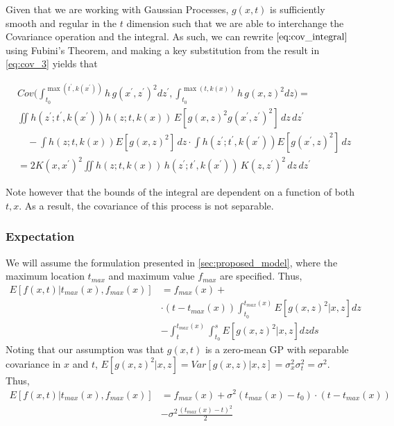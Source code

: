 Given that we are working with Gaussian Processes, $g(x,t)$ is sufficiently smooth and regular in the $t$ dimension such that we are able to interchange the Covariance operation and the integral. As such, we can rewrite $\eqref{eq:cov_integral}$ using Fubini's Theorem, and making a key substitution from the result in \eqref{eq:cov_3} yields that 

{\small
\begin{align}
\label{eq:cov_integral_interchange}
&Cov \bigg(\int_{t_0}^{\max(t^{'},k(x^{'}))} h\, g(x^{'},z^{'})^2 dz^{'}, \int_{t_0}^{\max(t,k(x))} h\, g(x,z)^2 dz \bigg) = \nonumber \\
&\iint h(z^{'}; t^{'}, k(x^{'})) h(z; t, k(x))\, E[g(x,z)^2 g(x^{'},z^{'})^2] \, dz \, dz^{'} \nonumber \\
&\quad - \int h(z; t, k(x)) E[g(x,z)^2]\,dz
    \cdot \int h(z^{'}; t^{'}, k(x^{'})) E[g(x^{'},z)^2]\,dz \nonumber \\
&= 2K(x,x^{'})^2 \iint h(z; t, k(x))\, h(z^{'}; t^{'}, k(x^{'}))\, K(z,z^{'})^2 \, dz \, dz^{'} \nonumber
\end{align}
}

Note however that the bounds of the integral are dependent on a function of both $t, x$. As a result, the covariance of this process is not separable.


\subsubsection{Expectation}
We will assume the formulation presented in \ref{sec:proposed_model}, where the maximum location $t_{max}$ and maximum value $f_{max}$ are specified. 
Thus,
\begin{align}
    E[f(x,t) | t_{max}(x), f_{max}(x)] & = f_{max}(x) +  \\ & \cdot(t-t_{max}(x))\int_{t_0}^{t_{max}(x)}E[g(x,z)^2 | x,z]dz  \nonumber \\ & -\int_{t}^{t_{max}(x)}  \int_{t_0}^s E[g(x,z)^2 | x,z]dzds \nonumber
\end{align}
Noting that our assumption was that $g(x,t)$ is a zero-mean GP with separable covariance in $x$ and $t$, $E[g(x,z)^2|x,z] = Var[g(x,z)|x,z] = \sigma^2_x\sigma^2_t = \sigma^2$. 
Thus, 
\begin{align}
\label{eq:expectation}
    E[f(x,t)|t_{max}(x), f_{max}(x)] & = f_{max}(x) + \sigma^2(t_{max}(x) - t_0)\cdot(t-t_{max}(x)) \nonumber \\ & -\sigma^2 \frac{(t_{max}(x)-t)^2}{2} 
\end{align}

